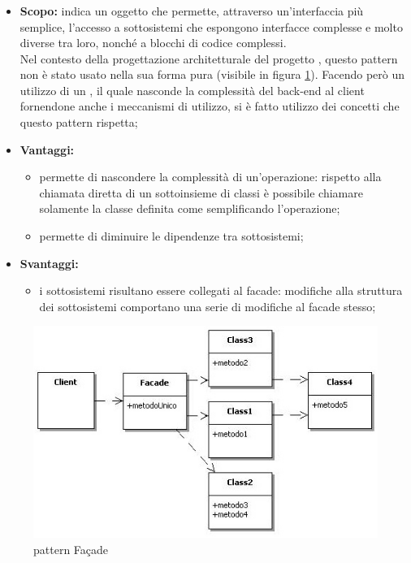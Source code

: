     \subsubsection{}
      \begin{itemize}
       \item \textbf{Scopo:}  indica un oggetto che permette, attraverso un'interfaccia più semplice, l'accesso a sottosistemi che espongono interfacce complesse e molto diverse tra loro, nonché a blocchi di codice complessi. \\
       Nel contesto della progettazione architetturale del progetto \PROGETTO, questo pattern non è stato usato nella sua forma pura (visibile in figura \ref{fig:facade}). Facendo però un utilizzo di un , il quale nasconde la complessità del back-end al client fornendone anche i meccanismi di utilizzo, si è fatto utilizzo dei concetti che questo pattern rispetta;
	\item \textbf{Vantaggi:}
	  \begin{itemize}
	   \item permette di nascondere la complessità di un'operazione: rispetto alla chiamata diretta di un sottoinsieme di classi è possibile chiamare solamente la classe definita come  semplificando l'operazione;
	   \item permette di diminuire le dipendenze tra sottosistemi;
	  \end{itemize}\newpage
	\item \textbf{Svantaggi:}
	  \begin{itemize}
	   \item i sottosistemi risultano essere collegati al facade: modifiche alla struttura dei sottosistemi comportano una serie di modifiche al facade stesso;
	  \end{itemize}
	\end{itemize}
	\begin{figure}[h]
		\centering
		\includegraphics[width=\textwidth,height=\textheight,keepaspectratio,scale=0.1]{images/patternfacade.jpg}
		\caption{pattern Façade}\label{fig:facade}
	\end{figure}
